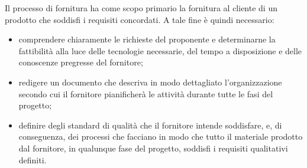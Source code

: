Il processo di fornitura ha come scopo primario la fornitura al cliente di un prodotto che soddisfi i 
requisiti concordati. A tale fine \`{e} quindi necessario:

\begin{itemize}
    \item comprendere chiaramente le richieste del proponente e determinarne la fattibilit\`{a} alla luce delle tecnologie necessarie, del tempo a disposizione e delle conoscenze pregresse del fornitore;
    \item redigere un documento che descriva in modo dettagliato l'organizzazione secondo cui il fornitore pianificher\`{a} le attivit\`{a} durante tutte le fasi del progetto; %
    \item definire degli standard di qualit\`{a} che il fornitore intende soddisfare, e, di conseguenza, dei processi che facciano in modo che tutto il materiale prodotto dal fornitore, in qualunque fase del progetto, soddisfi i requisiti qualitativi definiti.
\end{itemize}
